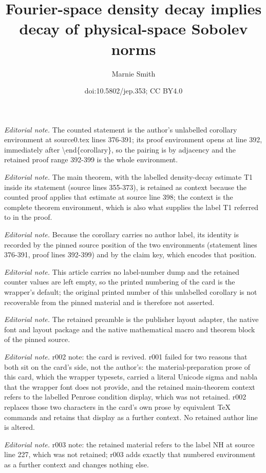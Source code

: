 \documentclass[10pt,a4paper]{article}
\title{Fourier-space density decay implies decay of physical-space Sobolev norms}
\author{Marnie Smith}
\date{doi:10.5802/jep.353; CC BY4.0}
\theoremstyle{plain}
\theoremstyle{remark}
\begin{document}
\maketitle
\noindent\textit{Editorial note.} The counted statement is the author's unlabelled corollary environment at source0.tex lines 376-391; its proof environment opens at line 392, immediately after \textbackslash{}end\{corollary\}, so the pairing is by adjacency and the retained proof range 392-399 is the whole environment.\par\medskip
\noindent\textit{Editorial note.} The main theorem, with the labelled density-decay estimate T1 inside its statement (source lines 355-373), is retained as context because the counted proof applies that estimate at source line 398; the context is the complete theorem environment, which is also what supplies the label T1 referred to in the proof.\par\medskip
\noindent\textit{Editorial note.} Because the corollary carries no author label, its identity is recorded by the pinned source position of the two environments (statement lines 376-391, proof lines 392-399) and by the claim key, which encodes that position.\par\medskip
\noindent\textit{Editorial note.} This article carries no label-number dump and the retained counter values are left empty, so the printed numbering of the card is the wrapper's default; the original printed number of this unlabelled corollary is not recoverable from the pinned material and is therefore not asserted.\par\medskip
\noindent\textit{Editorial note.} The retained preamble is the publisher layout adapter, the native font and layout package and the native mathematical macro and theorem block of the pinned source.\par\medskip
\noindent\textit{Editorial note.} r002 note: the card is revived. r001 failed for two reasons that both sit on the card's side, not the author's: the material-preparation prose of this card, which the wrapper typesets, carried a literal Unicode sigma and nabla that the wrapper font does not provide, and the retained main-theorem context refers to the labelled Penrose condition display, which was not retained. r002 replaces those two characters in the card's own prose by equivalent TeX commands and retains that display as a further context. No retained author line is altered.\par\medskip
\noindent\textit{Editorial note.} r003 note: the retained material refers to the label NH at source line 227, which was not retained; r003 adds exactly that numbered environment as a further context and changes nothing else.\par\medskip
\end{document}
